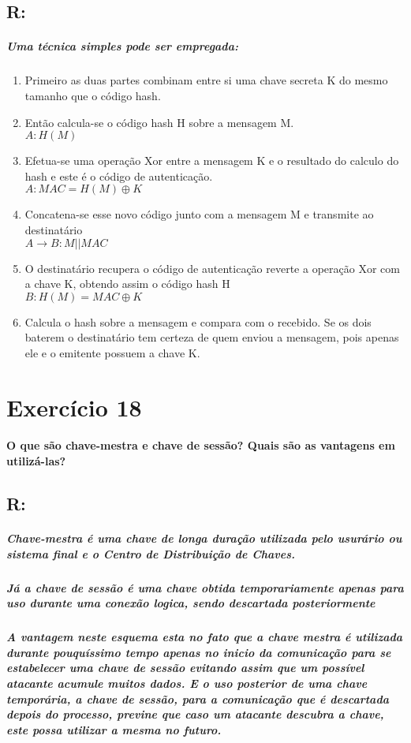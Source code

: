 \documentclass[10pt,a4paper]{report}
\begin{document}
\subsection*{R:}
\subparagraph{Uma técnica simples pode ser empregada:}
\begin{enumerate}[(1)]
\item  Primeiro as duas partes combinam entre si uma chave secreta K do mesmo tamanho que o código hash.
\item Então calcula-se o código hash H sobre a mensagem M.
\\ $A: H(M)$
\item Efetua-se uma operação Xor entre a mensagem K e o resultado do calculo do hash e este é o código de autenticação.
\\ $A:MAC = H(M) \oplus K$
\item Concatena-se esse novo código junto com a mensagem M e transmite ao destinatário
\\ $A \rightarrow B: M||MAC$
\item O destinatário recupera o código de autenticação reverte a operação Xor com a chave K, obtendo assim o código hash H
\\ $B:H(M) = MAC \oplus K $
\item Calcula o hash sobre a mensagem e compara com o recebido. Se os dois baterem o destinatário tem certeza de quem enviou a mensagem, pois apenas ele e o emitente possuem a chave K.
\end{enumerate}



\section*{Exercício 18}
\paragraph{O que são chave-mestra e chave de sessão? Quais são as vantagens em utilizá-las?}
\subsection*{R:}
\subparagraph{Chave-mestra é uma chave de longa duração utilizada pelo usurário ou sistema final e o Centro de Distribuição de Chaves.}
\subparagraph{Já a chave de sessão é uma chave obtida temporariamente apenas para uso durante uma conexão logica, sendo descartada posteriormente}
\subparagraph{A vantagem neste esquema esta no fato que a chave mestra é utilizada durante pouquíssimo tempo apenas no inicio da comunicação para se estabelecer uma chave de sessão evitando assim que um possível atacante acumule muitos dados. E o uso posterior de uma chave temporária, a chave de sessão, para a comunicação que é descartada depois do processo, previne que caso um atacante descubra a chave, este possa utilizar a mesma no futuro.}
\end{document}
